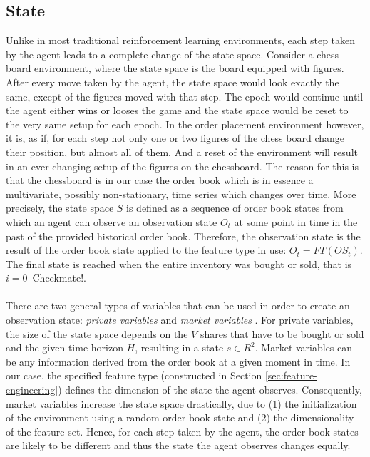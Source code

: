 \subsection{State}
\label{setup:state}
Unlike in most traditional reinforcement learning environments, each step taken by the agent leads to a complete change of the state space.
Consider a chess board environment, where the state space is the board equipped with figures. 
After every move taken by the agent, the state space would look exactly the same, except of the figures moved with that step.
The epoch would continue until the agent either wins or looses the game and the state space would be reset to the very same setup for each epoch.
In the order placement environment however, it is, as if, for each step not only one or two figures of the chess board change their position, but almost all of them.
And a reset of the environment will result in an ever changing setup of the figures on the chessboard.
The reason for this is that the chessboard is in our case the order book which is in essence a multivariate, possibly non-stationary, time series which changes over time.
More precisely, the state space $S$ is defined as a sequence of order book states from which an agent can observe an observation state $O_t$ at some point in time in the past of the provided historical order book.
Therefore, the observation state is the result of the order book state applied to the feature type in use: $O_t = FT(OS_t)$.
The final state is reached when the entire inventory was bought or sold, that is $i=0$--Checkmate!.
\\
\\
There are two general types of variables that can be used in order to create an observation state: \textit{private variables} and \textit{market variables} \cite{nevmyvaka2006reinforcement}.
For private variables, the size of the state space depends on the $V$ shares that have to be bought or sold and the given time horizon $H$, resulting in a state $s \in R^2$.
Market variables can be any information derived from the order book at a given moment in time.
In our case, the specified feature type (constructed in Section \ref{sec:feature-engineering}) defines the dimension of the state the agent observes.
Consequently, market variables increase the state space drastically, due to (1) the initialization of the environment using a random order book state and (2) the dimensionality of the feature set.
Hence, for each step taken by the agent, the order book states are likely to be different and thus the state the agent observes changes equally. 

